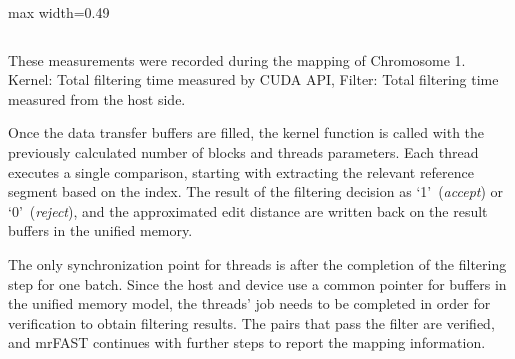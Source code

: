\begin{table}[!htbp]
\begin{adjustbox}{max width=0.49\textwidth}
\begin{tabular}{r|rrrr|rrrr}
\hline 
\end{tabular}
\end{adjustbox}
\begin{minipage}{0.49\textwidth}
\vspace*{0.2cm}
{\scriptsize
These measurements were recorded during the mapping of Chromosome 1. Kernel: Total filtering time measured by CUDA API, Filter: Total filtering time measured from the host side.}
\end{minipage}
\end{table}


Once the data transfer buffers are filled, the kernel function is called with the previously calculated number of blocks and threads parameters. Each thread executes a single comparison, starting with extracting the relevant reference segment based on the index. The result of the filtering decision as `1'~(\textit{accept}) or `0'~(\textit{reject}), and the approximated edit distance are written back on the result buffers in the unified memory. 

The only synchronization point for threads is after the completion of the filtering step for one batch. Since the host and device use a common pointer for buffers in the unified memory model, the threads' job needs to be completed in order for verification to obtain filtering results. The pairs that pass the filter are verified, and mrFAST continues with further steps to report the mapping information.